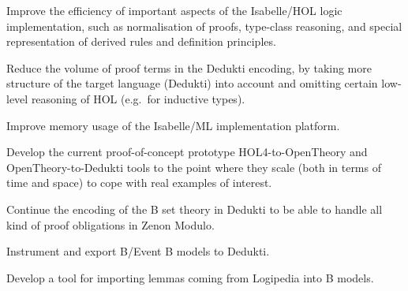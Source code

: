 \begin{workpackage}
\begin{tasklist}
\begin{task}[id=isabelle,
  title=Instrument Isabelle,
  shorttitle=Isabelle,
  lead=Tum,
  TumRM=5,
  wphases=1-12]
%
\vspace{-5mm}
\begin{compactitem}
\item Improve the efficiency of important aspects of the
  Isabelle/HOL logic implementation, such as normalisation of proofs,
  type-class reasoning, and special representation of derived rules
  and definition principles.
\item Reduce the volume of proof terms in the Dedukti encoding, by
taking more structure of the target language (Dedukti) into account
and omitting certain low-level reasoning of HOL (e.g.\ for inductive
types).
\item Improve memory usage of the Isabelle/ML implementation platform.
\end{compactitem}
\end{task}

\begin{task}[id=HOL4,
  title=Instrument HOL4,
  shorttitle=HOL4,
  lead=Cha,
  ChaRM=16,
  wphases=1-14]
%
\vspace{-5mm}
\begin{compactitem}
\item Develop the current proof-of-concept prototype
    HOL4-to-OpenTheory and OpenTheory-to-Dedukti tools to the point
    where they scale (both in terms of time and space) to cope with
    real examples of interest.
\end{compactitem}
\end{task}

\begin{task}[id=atelier-b,
  title=Instrument Atelier-B/Rodin,
  shorttitle=Atelier-B,
  lead=Imt,
  CleRM=14,
  ImtRM=1,
  TouRM=11,
  wphases=1-48]
%
\vspace{-5mm}
\begin{compactitem}
\item Continue the encoding of the B set theory in Dedukti to be
  able to handle all kind of proof obligations in Zenon Modulo.
\item Instrument and export B/Event B models to Dedukti.
\item Develop a tool for importing lemmas coming from Logipedia
into B models.
\end{compactitem}
\end{task}


\end{tasklist}
\end{workpackage}
